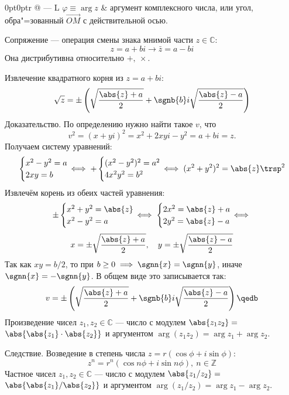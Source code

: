 \begin{tabularcx}{0pt}{0pt}{r @{ --- } L}{\textwidth}
$\varphi\equiv\arg z$ & {\ital аргумент комплексного числа}, или угол, обра"=зованный $\overrightarrow{OM}$ с действительной осью.
\end{tabularcx}

{\bold Сопряжение} --- операция смены знака мнимой части $z\in\mathbb{C}$:
$$z=a+bi\to\bar{z}=a-bi$$
Она {\ital дистрибутивна} относительно $+,\ \times$.

Извлечение квадратного корня из $z=a+bi$:
$$\sqrt{z}=\pm\left(\sqrt{\frac{\abs{z}+a}{2}}+\sgnb{b}i\sqrt{\frac{\abs{z}-a}{2}}\right)
$$
{\bold Доказательство.} По определению нужно найти такое $v$, что
$$v^2=(x+yi)^2=x^2+2xyi-y^2=a+bi=z.$$
Получаем систему уравнений:
$$\begin{cases}
x^2-y^2=a\\
2xy=b
\end{cases}\hspace*{-12pt}\iff
+\begin{cases}
(x^2-y^2)^2=a^2\\
4x^2y^2=b^2
\end{cases}\hspace*{-12pt}\iff
(x^2+y^2)^2=\abs{z}\trsp^2$$
Извлечём корень из обеих частей уравнения:
$$\pm\begin{cases}
x^2+y^2=\abs{z}\\
x^2-y^2=a
\end{cases}\hspace*{-12pt}\iff
\begin{cases}
2x^2=\abs{z}+a\\
2y^2=\abs{z}-a
\end{cases}\hspace*{-12pt}\iff$$
$$x=\pm\sqrt{\frac{\abs{z}+a}{2}},\quad y=\pm\sqrt{\frac{\abs{z}-a}{2}}$$
Так как $xy=b/2$, то при $b\geq 0\implies\sgnn{x}=\sgnn{y}$, иначе
$\sgnn{x}=-\sgnn{y}$. В общем виде это записывается так:
$$v=\pm\left(\sqrt{\frac{\abs{z}+a}{2}}+\sgnb{b}i\sqrt{\frac{\abs{z}-a}{2}}\right)\qedb$$
Произведение чисел $z_1,z_2\in\mathbb{C}$ --- число с модулем $\abs{z_1z_2}=$
$\abs{\abs{z_1}\cdot\abs{z_2}}$ и аргументом $\arg(z_1z_2)=\arg z_1+\arg z_2$.

{\bold Следствие.} Возведение в степень числа $z=r(\cos\phi+i\sin\phi)$:
$$z^n=r^n(\cos n\phi+i\sin n\phi),\ n\in\mathbb{Z}$$
Частное чисел $z_1,z_2\in\mathbb{C}$ --- число с модулем $\abs{z_1/z_2}=$
$\abs{\abs{z_1}/\abs{z_2}}$ и аргументом $\arg(z_1/z_2)=\arg z_1-\arg z_2$.

